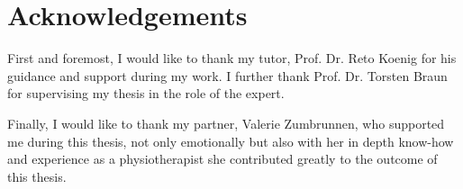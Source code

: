 \chapter*{Acknowledgements}
\label{chap:Acknowledgements}
\renewcommand{\thesection}{\arabic{section}}
\setcounter{section}{0}

First and foremost, I would like to thank my tutor, Prof. Dr. Reto Koenig for his guidance and support during my work.
I further thank Prof. Dr. Torsten Braun for supervising my thesis in the role of the expert.

Finally, I would like to thank my partner, Valerie Zumbrunnen, who supported me during this thesis, not only emotionally but also with her in depth know-how and experience as a physiotherapist she contributed greatly to the outcome of this thesis.